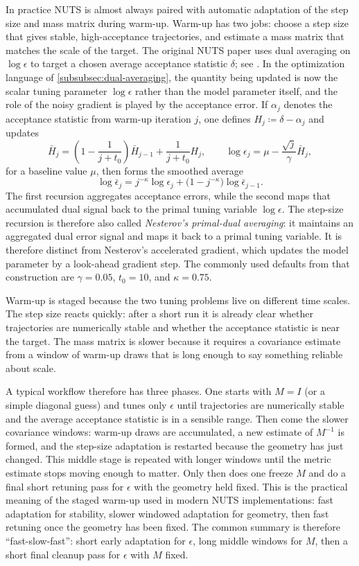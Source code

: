 In practice NUTS is almost always paired with automatic adaptation of the step size and mass matrix during warm-up.
Warm-up has two jobs: choose a step size that gives stable, high-acceptance trajectories, and estimate a mass matrix that matches the scale of the target.
The original NUTS paper uses dual averaging on $\log\epsilon$ to target a chosen average acceptance statistic $\delta$; see \citet[\S3.2, p.~1608]{hoffman_gelman_2014_nuts}.
In the optimization language of \cref{subsubsec:dual-averaging}, the quantity being updated is now the scalar tuning parameter $\log\epsilon$ rather than the model parameter itself, and the role of the noisy gradient is played by the acceptance error.
If $\alpha_j$ denotes the acceptance statistic from warm-up iteration $j$, one defines $H_j\coloneqq \delta-\alpha_j$ and updates
\[
  \bar H_j
  =
  \left(1-\frac{1}{j+t_0}\right)\bar H_{j-1}
  +
  \frac{1}{j+t_0}H_j,
  \qquad
  \log \epsilon_j
  =
  \mu - \frac{\sqrt{j}}{\gamma}\bar H_j,
\]
for a baseline value $\mu$, then forms the smoothed average
\[
  \log \bar\epsilon_j
  =
  j^{-\kappa}\log\epsilon_j
  +
  \bigl(1-j^{-\kappa}\bigr)\log \bar\epsilon_{j-1}.
\]
The first recursion aggregates acceptance errors, while the second maps that accumulated dual signal back to the primal tuning variable $\log\epsilon$.
The step-size recursion is therefore also called \emph{Nesterov's primal-dual averaging}: it maintains an aggregated dual error signal and maps it back to a primal tuning variable.
It is therefore distinct from Nesterov's accelerated gradient, which updates the model parameter by a look-ahead gradient step.
The commonly used defaults from that construction are $\gamma=0.05$, $t_0=10$, and $\kappa=0.75$.

Warm-up is staged because the two tuning problems live on different time scales.
The step size reacts quickly: after a short run it is already clear whether trajectories are numerically stable and whether the acceptance statistic is near the target.
The mass matrix is slower because it requires a covariance estimate from a window of warm-up draws that is long enough to say something reliable about scale.

A typical workflow therefore has three phases.
One starts with \(M=I\) (or a simple diagonal guess) and tunes only \(\epsilon\) until trajectories are numerically stable and the average acceptance statistic is in a sensible range.
Then come the slower covariance windows: warm-up draws are accumulated, a new estimate of \(M^{-1}\) is formed, and the step-size adaptation is restarted because the geometry has just changed.
This middle stage is repeated with longer windows until the metric estimate stops moving enough to matter.
Only then does one freeze \(M\) and do a final short retuning pass for \(\epsilon\) with the geometry held fixed.
This is the practical meaning of the staged warm-up used in modern NUTS implementations: fast adaptation for stability, slower windowed adaptation for geometry, then fast retuning once the geometry has been fixed.
The common summary is therefore ``fast-slow-fast'': short early adaptation for \(\epsilon\), long middle windows for \(M\), then a short final cleanup pass for \(\epsilon\) with \(M\) fixed.

